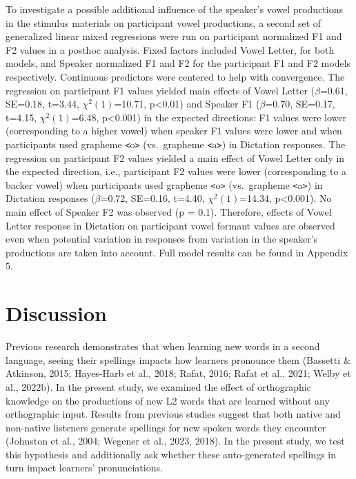 \documentclass[
  english,
  man,floatsintext]{apa7}
\begin{document}
To investigate a possible additional influence of the speaker's vowel productions in the stimulus materials on participant vowel productions, a second set of generalized linear mixed regressions were run on participant normalized F1 and F2 values in a posthoc analysis. Fixed factors included Vowel Letter, for both models, and Speaker normalized F1 and F2 for the participant F1 and F2 models respectively. Continuous predictors were centered to help with convergence. The regression on participant F1 values yielded main effects of Vowel Letter (\(\beta\)=0.61, SE=0.18, t=3.44, \(\chi^2(1)\)=10.71, p\textless0.01) and Speaker F1 (\(\beta\)=0.70, SE=0.17, t=4.15, \(\chi^2(1)\)=6.48, p\textless0.001) in the expected directions: F1 values were lower (corresponding to a higher vowel) when speaker F1 values were lower and when participants used grapheme \texttt{\textless{}}o\texttt{\textgreater{}} (vs.~grapheme \texttt{\textless{}}a\texttt{\textgreater{}}) in Dictation responses. The regression on participant F2 values yielded a main effect of Vowel Letter only in the expected direction, i.e., participant F2 values were lower (corresponding to a backer vowel) when participants used grapheme \texttt{\textless{}}o\texttt{\textgreater{}} (vs.~grapheme \texttt{\textless{}}a\texttt{\textgreater{}}) in Dictation responses (\(\beta\)=0.72, SE=0.16, t=4.40, \(\chi^2(1)\)=14.34, p\textless0.001). No main effect of Speaker F2 was observed (p = 0.1). Therefore, effects of Vowel Letter response in Dictation on participant vowel formant values are observed even when potential variation in responses from variation in the speaker's productions are taken into account. Full model results can be found in Appendix 5.

\section{Discussion}\label{discussion}

Previous research demonstrates that when learning new words in a second language, seeing their spellings impacts how learners pronounce them (Bassetti \& Atkinson, 2015; Hayes-Harb et al., 2018; Rafat, 2016; Rafat et al., 2021; Welby et al., 2022b). In the present study, we examined the effect of orthographic knowledge on the productions of new L2 words that are learned without any orthographic input. Results from previous studies suggest that both native and non-native listeners generate spellings for new spoken words they encounter (Johnston et al., 2004; Wegener et al., 2023, 2018). In the present study, we test this hypothesis and additionally ask whether these auto-generated spellings in turn impact learners' pronunciations.
\end{document}
